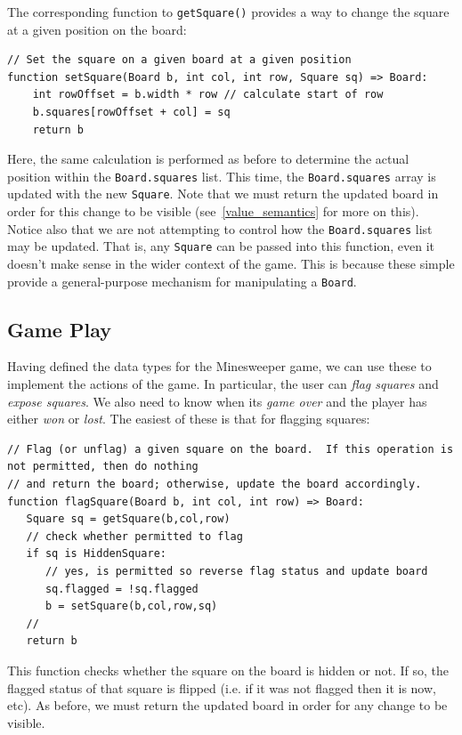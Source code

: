 The corresponding function to \lstinline{getSquare()} provides a way to change the square at a given position on the board:

\begin{lstlisting}
// Set the square on a given board at a given position
function setSquare(Board b, int col, int row, Square sq) => Board:
    int rowOffset = b.width * row // calculate start of row
    b.squares[rowOffset + col] = sq
    return b
\end{lstlisting}

Here, the same calculation is performed as before to determine the actual position within the \lstinline{Board.squares} list.  This time, the \lstinline{Board.squares} array is updated with the new \lstinline{Square}.  Note that we must return the updated board in order for this change to be visible (see~\ref{value_semantics} for more on this).  Notice also that we are not attempting to control how the \lstinline{Board.squares} list may be updated.  That is, any \lstinline{Square} can be passed into this function, even it doesn't make sense in the wider context of the game.  This is because these simple provide a general-purpose mechanism for manipulating a \lstinline{Board}.

\subsection{Game Play}

Having defined the data types for the Minesweeper game, we can use these to implement the actions of the game.  In particular, the user can {\em flag squares} and {\em expose squares}.  We also need to know when its {\em game over} and the player has either {\em won} or {\em lost}.  The easiest of these is that for flagging squares:

\begin{lstlisting}
// Flag (or unflag) a given square on the board.  If this operation is not permitted, then do nothing
// and return the board; otherwise, update the board accordingly.
function flagSquare(Board b, int col, int row) => Board:
   Square sq = getSquare(b,col,row)
   // check whether permitted to flag
   if sq is HiddenSquare:
      // yes, is permitted so reverse flag status and update board
      sq.flagged = !sq.flagged
      b = setSquare(b,col,row,sq)
   //
   return b
\end{lstlisting}

This function checks whether the square on the board is hidden or not.  If so, the flagged status of that square is flipped (i.e. if it was not flagged then it is now, etc).  As before,  we must return the updated board in order for any change to be visible.

